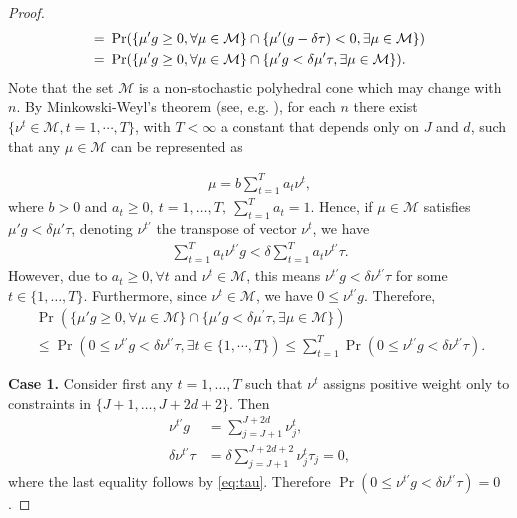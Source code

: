 \documentclass[letterpaper,11pt]{article}
\theoremstyle{myplain}
\theoremstyle{mydefinition}
\theoremstyle{myremark}
\renewcommand{\cite}{\citet}
\numberwithin{equation}{section}
\numberwithin{figure}{section}
\begin{document}
\begin{appendices}
\begin{proof}
\begin{align}
=&~\Pr(\{\mu'g\ge 0, \forall\mu\in \mathcal M\}\cap \{\mu'(g-\delta \tau)< 0, \exists\mu\in \mathcal M\})\notag \\
= &~\Pr(\{\mu'g\ge 0, \forall\mu\in \mathcal M\}\cap\{ \mu'g< \delta\mu'\tau, \exists\mu\in \mathcal M\})
\label{eq:int4}.
\end{align}
Note that the set $\mathcal M$ is a non-stochastic polyhedral cone which may change with $n$. By Minkowski-Weyl's theorem (see, e.g. \cite[Theorem 3.52]{Rockafellar_Wets2005aBK}), for each $n$ there exist $\{\nu^t\in \mathcal M,t=1,\cdots, T\}$, with $T<\infty$ a constant that depends only on $J$ and $d$, such that
any $\mu\in\mathcal M$ can be represented as



\begin{align}
\mu=b \sum_{t=1}^T a_t\nu^t,\label{eq:int5}
\end{align}
where $b>0$ and $a_t\ge 0, ~t=1,\dots,T, ~\sum_{t=1}^T a_t=1$. Hence, if $\mu\in\mathcal M$ satisfies $ \mu'g< \delta\mu'\tau$, denoting $\nu^{t \prime}$ the transpose of vector $\nu^t$, we have
\begin{align}
\sum_{t=1}^T	a_t\nu^{t \prime}g<\delta\sum_{t=1}^T	a_t\nu^{t \prime}\tau.\label{eq:int6}
\end{align}
However, due to $a_t\ge 0,\forall t$ and $\nu^t\in\mathcal M$, this means  $\nu^{t\prime}g< \delta\nu^{t \prime}\tau$ for some $t\in\{1,\dots,T\}.$ Furthermore, since $\nu^t\in\mathcal M$, we have $0\le \nu^{t\prime}g$.
Therefore,
\begin{multline}
{\Pr}\left(\{\mu'g\ge 0, \forall\mu\in \mathcal M\}\cap\{\mu'g< \delta \mu^\prime \tau, \exists\mu\in \mathcal M\}\right)\\
	\le {\Pr}\left(0\le\nu^{t\prime}g< \delta\nu^{t\prime}\tau,\exists t\in\{1,\cdots,T\}\right)
	\le \sum_{t=1}^T {\Pr}\left(0\le\nu^{t\prime}g< \delta\nu^{t\prime}\tau \right).\label{eq:int7}
	\end{multline}

\noindent \textbf{Case 1.} Consider first any $t =1,\dots,T$ such that $\nu^t$ assigns positive weight only to constraints in $\{J+1,\dots,J+2d+2\}$. Then
\begin{align*}
\nu^{t \prime} g&=\sum_{j=J+1}^{J+2d}\nu^t_{j},\\
\delta\nu^{t \prime} \tau &=\delta\sum_{j=J+1}^{J+2d+2}\nu^t_{j} \tau_j=0,
\end{align*}
where the last equality follows by \eqref{eq:tau}.
Therefore 
${\Pr}\left(0\le\nu^{t\prime}g< \delta\nu^{t\prime}\tau \right)=0$.


\end{proof}
\end{appendices}
\end{document}
